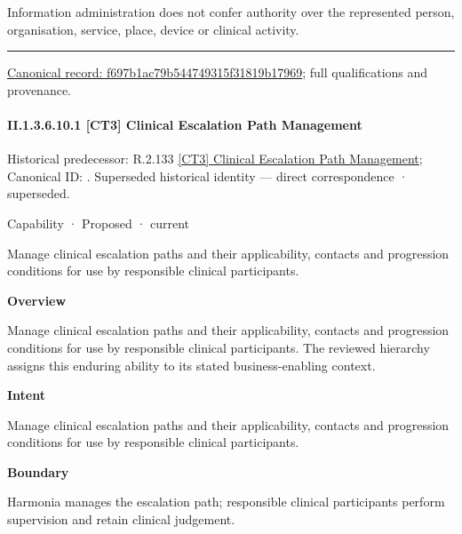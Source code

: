 Information administration does not confer authority over the represented person, organisation, service, place, device or clinical activity.



\medskip\hrule\medskip

{\footnotesize \href{../../../../continuum/strategy/capability/f697b1ac79b544749315f31819b17969.md}{Canonical record: f697b1ac79b544749315f31819b17969}; full qualifications and provenance.}\par
\paragraph*{II.1.3.6.10.1 [CT3] Clinical Escalation Path Management}
\label{navigation:II.1.3.6.10.1}

{\small Historical predecessor: R.2.133 \hyperref[element:759a2e52172345e8ad1bc96d7e5ddad3]{[CT3] Clinical Escalation Path Management}; Canonical ID: \texttt{}. Superseded historical identity — direct correspondence · superseded.}\par
\label{element:cca86a32ba8c4dda84caeaa248e9f444}
{\small Capability · Proposed · current}\par

Manage clinical escalation paths and their applicability, contacts and progression conditions for use by responsible clinical participants.



\textbf{Overview}



Manage clinical escalation paths and their applicability, contacts and progression conditions for use by responsible clinical participants. The reviewed hierarchy assigns this enduring ability to its stated business-enabling context.



\textbf{Intent}



Manage clinical escalation paths and their applicability, contacts and progression conditions for use by responsible clinical participants.



\textbf{Boundary}



Harmonia manages the escalation path; responsible clinical participants perform supervision and retain clinical judgement.


